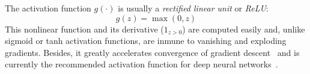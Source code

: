The activation function $g(\cdot)$ is usually a \emph{rectified linear unit} or \emph{ReLU}:
\begin{equation}
	g(z) = \max(0,z)
\end{equation}
This nonlinear function and its derivative ($1_{z>0}$) are computed easily and, unlike sigmoid or tanh activation functions, are inmune to vanishing and exploding gradients. Besides, it greatly accelerates convergence of gradient descent~\cite{Krizhevsky2012} and is currently the recommended activation function for deep neural networks~\cite{Karpathy2015}.

